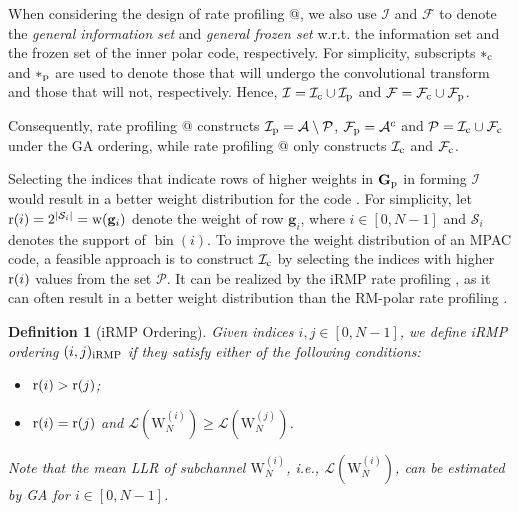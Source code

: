 \documentclass[12pt, draftclsnofoot, peerreview, onecolumn]{IEEEtran}
\makeatletter
\theoremstyle{noparent}
\newtheorem{definition}{\textbf{{Definition}}}
\newcommand{\Rmnum}[1]{\expandafter\@slowromancap\romannumeral #1@}
\DeclareMathOperator\bin{bin}
\makeatother
\begin{document}
When considering the design of rate profiling \Rmnum{1}, 
we also use $\mathcal{I}$ and $\mathcal{F}$ to 
denote the \textit{general information set} and \textit{general frozen set} 
w.r.t. the information set and the frozen set of the inner polar code, respectively.
For simplicity, subscripts $*_{\rm c}$ and $*_{\rm p}$ are used to denote those that will undergo 
the convolutional transform and those that will not, respectively. 
Hence, $\mathcal{I}=\mathcal{I}_{\rm c} \cup \mathcal{I}_{\rm p}$
and $\mathcal{F}=\mathcal{F}_{\rm c} \cup \mathcal{F}_{\rm p}$.






Consequently, rate profiling \Rmnum{2} constructs 
$\mathcal{I}_{\rm p}=\mathcal{A}\setminus \mathcal{P}$, 
$\mathcal{F}_{\rm p}=\mathcal{A}^c$ and 
$\mathcal{P}=\mathcal{I}_{\rm c} \cup \mathcal{F}_{\rm c}$ under the GA ordering, 
while rate profiling \Rmnum{1} only constructs $\mathcal{I}_{\rm c}$ and 
$\mathcal{F}_{\rm c}$.

Selecting the indices that indicate rows of higher weights in $\mathbf{G}_{\rm{p}}$ in forming $\mathcal{I}$ 
would result in a better weight distribution for the code \cite{Li2014RMPolarCodes}\cite{Rowshan2021PolarizationAdjustedConvolutional}.
For simplicity, let ${\rm r}(i)=2^{|\mathcal{S}_i|}={\rm w}(\mathbf{g}_i)$ denote the weight of row $\mathbf{g}_i$, where $i\in[0,N-1]$ and $\mathcal{S}_i$ denotes the support of $\bin(i)$.
To improve the weight distribution of an MPAC code, 
a feasible approach is to construct $\mathcal{I}_{\rm c}$
by selecting the indices with higher ${\rm r}(i)$ values from the set $\mathcal{P}$.
It can be realized by the iRMP rate profiling \cite{Rowshan2021PolarizationAdjustedConvolutional},
as it can often
result in a better weight distribution 
than the RM-polar rate profiling \cite{Li2014RMPolarCodes}.














\begin{definition}[iRMP Ordering]
    \label{iRMP_ordering}
    Given indices $i, j\in[0,N-1]$, we define iRMP ordering $(i,j)_{\rm iRMP}$
    if they satisfy either of the following conditions:
    \begin{itemize}
        \item ${\rm r}(i)>{\rm r}(j)$;
        \item ${\rm r}(i)={\rm r}(j)$ and ${\mathcal{L}}(\mathrm{W}_{N}^{(i)})\geq {\mathcal{L}}(\mathrm{W}_{N}^{(j)})$.
    \end{itemize}
    Note that the mean LLR of subchannel $\mathrm{W}_{N}^{(i)}$, i.e., ${\mathcal{L}}(\mathrm{W}_{N}^{(i)})$, 
    can be estimated by GA for $i \in [0,N-1]$.
\end{definition}
\end{document}
